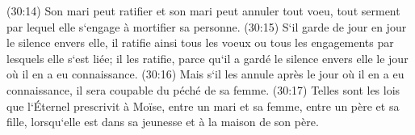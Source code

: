 \verse (30:14) Son mari peut ratifier et son mari peut annuler tout voeu, tout serment par lequel elle s`engage à mortifier sa personne. 
\verse (30:15) S`il garde de jour en jour le silence envers elle, il ratifie ainsi tous les voeux ou tous les engagements par lesquels elle s`est liée; il les ratifie, parce qu`il a gardé le silence envers elle le jour où il en a eu connaissance. 
\verse (30:16) Mais s`il les annule après le jour où il en a eu connaissance, il sera coupable du péché de sa femme. 
\verse (30:17) Telles sont les lois que l`Éternel prescrivit à Moïse, entre un mari et sa femme, entre un père et sa fille, lorsqu`elle est dans sa jeunesse et à la maison de son père. 

